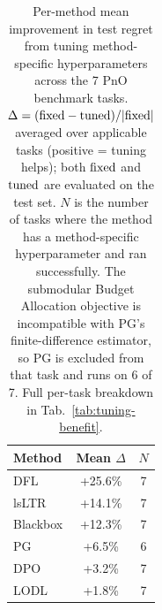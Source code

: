 \begin{table}[t]
\centering
\caption[Per-method mean improvement in test regret from tuning method-specific hyperparameters.]{Per-method mean improvement in test regret from tuning method-specific hyperparameters across the 7 PnO benchmark tasks. $\Delta = ({\rm fixed} - {\rm tuned})/|{\rm fixed}|$ averaged over applicable tasks (positive = tuning helps); both ${\rm fixed}$ and ${\rm tuned}$ are evaluated on the test set. $N$ is the number of tasks where the method has a method-specific hyperparameter and ran successfully. The submodular Budget Allocation objective is incompatible with PG's finite-difference estimator, so PG is excluded from that task and runs on 6 of 7. Full per-task breakdown in Tab.~\ref{tab:tuning-benefit}.}
\label{tab:tuning-benefit-summary}
\setlength{\tabcolsep}{6pt}
\renewcommand{\arraystretch}{1.05}
\begin{tabular}{@{}lcc@{}}
\toprule
Method & Mean $\Delta$ & $N$ \\
\midrule
DFL      & +25.6\% & 7 \\
lsLTR    & +14.1\% & 7 \\
Blackbox & +12.3\% & 7 \\
PG       & +6.5\%  & 6 \\
DPO      & +3.2\%  & 7 \\
LODL     & +1.8\%  & 7 \\
\bottomrule
\end{tabular}
\end{table}
